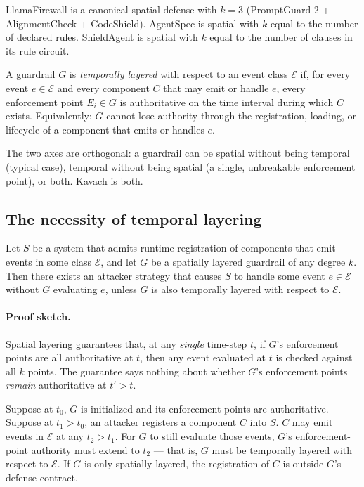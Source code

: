 LlamaFirewall is a canonical spatial defense with \(k=3\) (PromptGuard 2 +
AlignmentCheck + CodeShield). AgentSpec is spatial with \(k\) equal to the
number of declared rules. ShieldAgent is spatial with \(k\) equal to the
number of clauses in its rule circuit.

\begin{definition}
\label{def:temporal}
A guardrail \(G\) is \emph{temporally layered} with respect to an event
class \(\mathcal{E}\) if, for every event \(e \in \mathcal{E}\) and every
component \(C\) that may emit or handle \(e\), every enforcement point
\(E_i \in G\) is authoritative on the time interval during which \(C\)
exists. Equivalently: \(G\) cannot lose authority through the registration,
loading, or lifecycle of a component that emits or handles \(e\).
\end{definition}

The two axes are orthogonal: a guardrail can be spatial without being
temporal (typical case), temporal without being spatial (a single,
unbreakable enforcement point), or both. Kavach is both.

\subsection{The necessity of temporal layering}

\begin{claim}
\label{claim:necessity}
Let \(S\) be a system that admits runtime registration of components that
emit events in some class \(\mathcal{E}\), and let \(G\) be a spatially
layered guardrail of any degree \(k\). Then there exists an attacker
strategy that causes \(S\) to handle some event \(e \in \mathcal{E}\)
without \(G\) evaluating \(e\), unless \(G\) is also temporally layered
with respect to \(\mathcal{E}\).
\end{claim}

\paragraph{Proof sketch.} Spatial layering guarantees that, at any
\emph{single} time-step \(t\), if \(G\)'s enforcement points are all
authoritative at \(t\), then any event evaluated at \(t\) is checked
against all \(k\) points. The guarantee says nothing about whether
\(G\)'s enforcement points \emph{remain} authoritative at \(t' > t\).

Suppose at \(t_0\), \(G\) is initialized and its enforcement points are
authoritative. Suppose at \(t_1 > t_0\), an attacker registers a component
\(C\) into \(S\). \(C\) may emit events in \(\mathcal{E}\) at any
\(t_2 > t_1\). For \(G\) to still evaluate those events, \(G\)'s
enforcement-point authority must extend to \(t_2\) — that is, \(G\) must
be temporally layered with respect to \(\mathcal{E}\). If \(G\) is only
spatially layered, the registration of \(C\) is outside \(G\)'s defense
contract.

